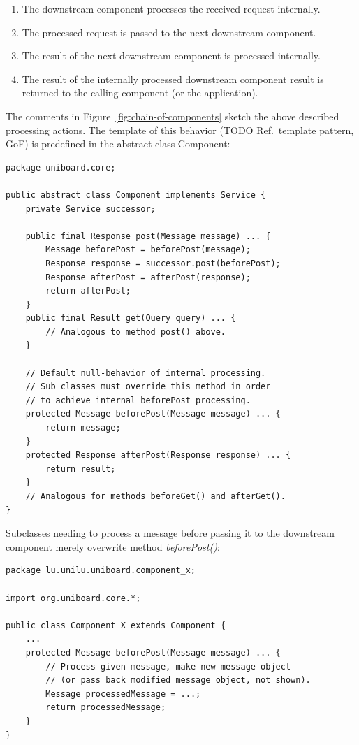 \documentclass[oneside]{scrreprt}
\newcommand{\fig}[1]{Figure~\ref{#1}}
\begin{document}
\begin{enumerate}
	\item The downstream component processes
		the received request internally.
	\item The processed request is passed to the
		next downstream component.
	\item The result of the next downstream component is
		processed internally.
	\item The result of the internally processed
		downstream component result
		is returned to the calling
		component (or the application).
\end{enumerate}

The comments in \fig{fig:chain-of-components} sketch
the above described processing actions. The template
of this behavior (TODO Ref.\ template pattern, GoF)
is predefined in the abstract class Component:

\begin{lstlisting}
package uniboard.core;

public abstract class Component implements Service {
    private Service successor;

    public final Response post(Message message) ... {
        Message beforePost = beforePost(message);
        Response response = successor.post(beforePost);
        Response afterPost = afterPost(response);
        return afterPost;
    }
    public final Result get(Query query) ... {
        // Analogous to method post() above.
    }

    // Default null-behavior of internal processing.
    // Sub classes must override this method in order
    // to achieve internal beforePost processing.
    protected Message beforePost(Message message) ... {
        return message;
    }
    protected Response afterPost(Response response) ... {
        return result;
    }
    // Analogous for methods beforeGet() and afterGet().
}
\end{lstlisting}

Subclasses needing to process a message before passing it
to the downstream component merely overwrite method
\emph{beforePost()}:

\begin{lstlisting}
package lu.unilu.uniboard.component_x;

import org.uniboard.core.*;

public class Component_X extends Component {
    ...
    protected Message beforePost(Message message) ... {
        // Process given message, make new message object
        // (or pass back modified message object, not shown).
        Message processedMessage = ...;
        return processedMessage;
    }
}
\end{lstlisting}
\end{document}
